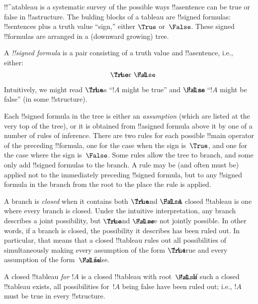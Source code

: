 \documentclass[../../../include/open-logic-section]{subfiles}
\begin{document}
      {}
      {}


!!^a{tableau} is a systematic survey of the possible ways
!!a{sentence} can be true or false in !!a{structure}. The bulding
blocks of a tableau are !!{signed formula}s: !!{sentence}s plus a
truth value ``sign,'' either $\True$ or~$\False$. These signed
!!{formula}s are arranged in a (downward growing) tree.

\begin{defn}
  A \emph{!!{signed formula}} is a pair consisting of a truth value
  and !!a{sentence}, i.e., either:
  \[
  \sFmla{\True}{!A} \text{ or } \sFmla{\False}{!A}.
  \]
\end{defn}

Intuitively, we might read $\sFmla{\True}{!A}$ as ``$!A$ might be
true'' and $\sFmla{\False}{!A}$ as ``$!A$ might be false'' (in some
!!{structure}).

Each !!{signed formula} in the tree is either an \emph{assumption}
(which are listed at the very top of the tree), or it is obtained from
!!a{signed formula} above it by one of a number of rules of
inference. There are two rules for each possible !!{main operator} of
the preceding !!{formula}, one for the case when the sign is~$\True$,
and one for the case where the sign is~$\False$. Some rules allow the
tree to branch, and some only add !!{signed formula}s to the branch.
A rule may be (and often must be) applied not to the immediately
preceding !!{signed formula}, but to any !!{signed formula} in the
branch from the root to the place the rule is applied.

A branch is \emph{closed} when it contains both $\sFmla{\True}{!A}$
and $\sFmla{\False}{!A}$. A closed !!{tableau} is one where every branch
is closed.  Under the intuitive interpretation, any branch describes a
joint possibility, but $\sFmla{\True}{!A}$ and $\sFmla{\False}{!A}$
are not jointly possible. In other words, if a branch is closed, the
possibility it describes has been ruled out. In particular, that means
that a closed !!{tableau} rules out all possibilities of simultaneously
making every assumption of the form $\sFmla{\True}{!A}$ true and every
assumption of the form~$\sFmla{\False}{!A}$ false.

A closed !!{tableau} \emph{for $!A$} is a closed !!{tableau} with
root~$\sFmla{\False}{!A}$. If such a closed !!{tableau} exists, all
possibilities for~$!A$ being false have been ruled out; i.e., $!A$
must be true in every !!{structure}.
\end{document}
